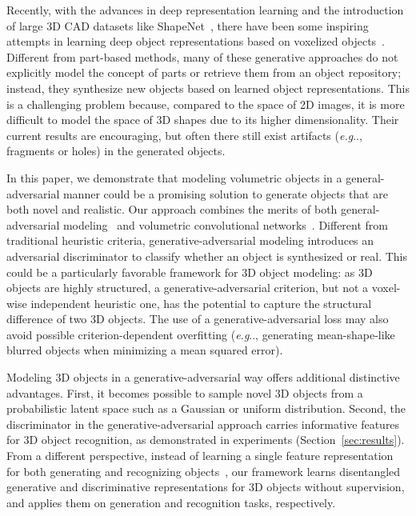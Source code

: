 \documentclass{article}
\makeatletter
\newcommand{\sect}[1]{Section~\ref{#1}}
\DeclareRobustCommand\onedot{\futurelet\@let@token\@onedot}
\def\@onedot{\ifx\@let@token.\else.\null\fi\xspace}
\def\eg{\emph{e.g}\onedot} \def\Eg{\emph{E.g}\onedot}
\makeatother
\begin{document}
Recently, with the advances in deep representation learning and the introduction of large 3D CAD datasets like ShapeNet~\citep{chang2015shapenet,wu20153d}, there have been some inspiring attempts in learning deep object representations based on voxelized objects~\citep{girdhar2016learning,su2015multi,qi2016volumetric}. 
Different from part-based methods, many of these generative approaches do not explicitly model the concept of parts or retrieve them from an object repository; instead, they synthesize new objects based on learned object representations. This is a challenging problem because, compared to the space of 2D images, it is more difficult to model the space of 3D shapes due to its higher dimensionality.
Their current results are encouraging, but often there still exist artifacts (\eg, fragments or holes) in the generated objects. 

In this paper, we demonstrate that modeling volumetric objects in a general-adversarial manner could be a promising solution to generate objects that are both novel and realistic. Our approach combines the merits of both general-adversarial  modeling~\citep{goodfellow2014generative,radford2016unsupervised} and volumetric convolutional networks~\citep{maturana2015voxnet,wu20153d}.
Different from traditional heuristic criteria, generative-adversarial modeling introduces an adversarial discriminator to classify whether an object is synthesized or real. 
This could be a particularly favorable framework for 3D object modeling: as 3D objects are highly structured, a generative-adversarial criterion, but not a voxel-wise independent heuristic one, has the potential to capture the structural difference of two 3D objects.
The use of a generative-adversarial loss may also avoid possible criterion-dependent overfitting  (\eg, generating mean-shape-like blurred objects when minimizing a mean squared error). 

Modeling 3D objects in a generative-adversarial way offers additional distinctive advantages. First, it becomes possible to sample novel 3D objects from a probabilistic latent space such as a Gaussian or uniform distribution. Second, the discriminator in the generative-adversarial approach carries informative features for 3D object recognition, as demonstrated in experiments (\sect{sec:results}). From a different perspective, instead of learning a single feature representation for both generating and recognizing objects~\citep{girdhar2016learning,sharma2016vconv}, our framework learns disentangled generative and discriminative representations for 3D objects without supervision, and applies them on generation and recognition tasks, respectively.
\end{document}
